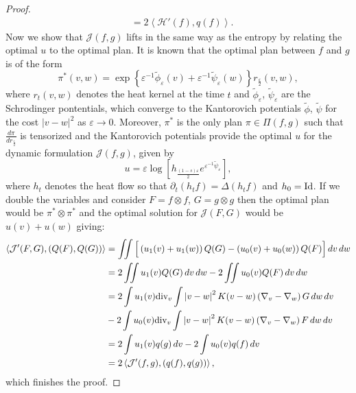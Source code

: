 \documentclass[11pt]{amsart}
\numberwithin{equation}{section}
\begin{document}
\begin{proof}
\begin{align*}
    & =2\left\langle \mathcal{H}'(f),q(f)\right\rangle .
  \end{align*}
  Now we show that $\mathcal J(f,g)$ lifts in the same way as the entropy by relating the optimal $u$ to the optimal plan. It is known that the optimal plan between $f$ and $g$ is of the form
  \begin{equation*}
    \pi^*(v,w)=\exp\left\{\varepsilon^{-1}\tilde \phi_\varepsilon(v)+ \varepsilon^{-1}\tilde\psi_\varepsilon(w)\right\}r_{\frac{\varepsilon}{2}}(v,w),
  \end{equation*}
  where $r_t(v,w)$ denotes the heat kernel at the time $t$ and $\tilde \phi_\varepsilon$, $\tilde \psi_\varepsilon$ are the Schrodinger pontentials, which converge to the Kantorovich potentials $\tilde \phi$, $\tilde \psi$ for the cost $|v-w|^2$ as $\varepsilon\to 0$. Moreover, $\pi^*$ is the only plan $\pi\in\Pi(f,g)$ such that $\displaystyle\frac{d\pi}{dr_{\frac{\varepsilon}{2}}}$ is tensorized and the Kantorovich potentials provide the optimal $u$ for the dynamic formulation $\mathcal J(f,g)$, given by
  \begin{equation*}
    u=\varepsilon\log\left[h_{\frac{(1-s)\varepsilon}{2}}e^{\varepsilon^{-1}\tilde\psi_{\varepsilon}}\right],
  \end{equation*}
  where $h_t$ denotes the heat flow so that $\partial_t (h_tf) = \Delta (h_tf)$ and $h_0=\textnormal{Id}$. If we double the variables and consider $F=f\otimes f$, $G=g\otimes g$ then the optimal plan would be $\pi^* \otimes \pi^*$ and the optimal solution for $\mathcal J(F,G)$ would be $u(v)+u(w)$ giving:
  \begin{align*}
    \left\langle \mathcal{J}'(F,G),\left(Q(F),Q(G)\right)\right\rangle &
    =\iint\Big[\left(u_{1}(v)+u_{1}(w)\right)Q(G)-\left(u_{0}(v)+u_{0}(w)\right)Q(F)\Big]\,dv\,dw	\\
    &=2\iint u_{1}(v)Q(G)\,dv\,dw-2\iint u_{0}(v)Q(F)\,dv\,dw\\
    & =2\int u_{1}(v)\textnormal{div}_{v}\int\left|v-w\right|^{2}K(v-w)\left(\nabla_{v}-\nabla_{w}\right)G\,dw\,dv\\
    & -2\int u_{0}(v)\textnormal{div}_{v}\int\left|v-w\right|^{2}K(v-w)\left(\nabla_{v}-\nabla_{w}\right)F\,dw\,dv\\
    & =2\int u_{1}(v)q(g)\,dv-2\int u_{0}(v)q(f)\,dv\\
    & =2\left\langle \mathcal{J}'(f,g),\left(q(f),q(g)\right)\right\rangle,
  \end{align*}
  which finishes the proof.
\end{proof}
\end{document}
